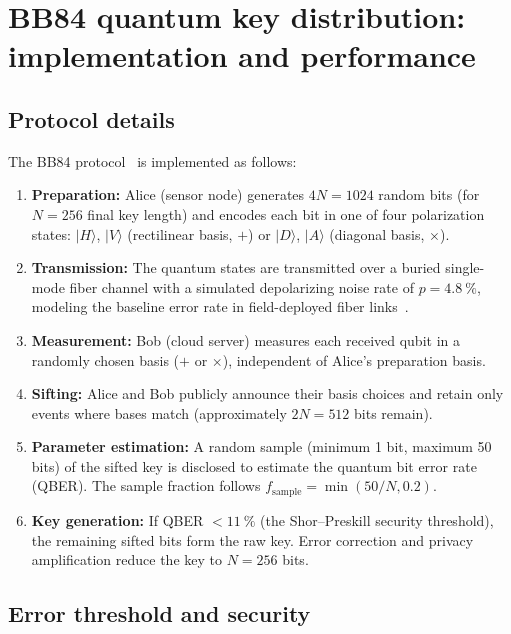 \documentclass[11pt,a4paper]{article}
\begin{document}

\section{BB84 quantum key distribution: implementation and performance}
\label{SI-sec:qkd}

\subsection{Protocol details}

The BB84 protocol~\cite{Bennett1984} is implemented as follows:

\begin{enumerate}
\item \textbf{Preparation:} Alice (sensor node) generates $4N = 1024$ random bits (for $N = 256$ final key length) and encodes each bit in one of four polarization states: $|H\rangle$, $|V\rangle$ (rectilinear basis, $+$) or $|D\rangle$, $|A\rangle$ (diagonal basis, $\times$).
\item \textbf{Transmission:} The quantum states are transmitted over a buried single-mode fiber channel with a simulated depolarizing noise rate of $p = \qty{4.8}{\percent}$, modeling the baseline error rate in field-deployed fiber links~\cite{Zahidy2024}.
\item \textbf{Measurement:} Bob (cloud server) measures each received qubit in a randomly chosen basis ($+$ or $\times$), independent of Alice's preparation basis.
\item \textbf{Sifting:} Alice and Bob publicly announce their basis choices and retain only events where bases match (approximately $2N = 512$ bits remain).
\item \textbf{Parameter estimation:} A random sample (minimum 1 bit, maximum 50 bits) of the sifted key is disclosed to estimate the quantum bit error rate (QBER). The sample fraction follows $f_{\mathrm{sample}} = \min(50/N, 0.2)$.
\item \textbf{Key generation:} If QBER $< \qty{11}{\percent}$ (the Shor--Preskill security threshold), the remaining sifted bits form the raw key. Error correction and privacy amplification reduce the key to $N = 256$ bits.
\end{enumerate}

\subsection{Error threshold and security}
\end{document}
